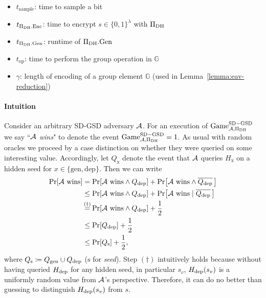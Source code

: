 \begin{theorem}
\begin{itemize}
		\item $t_{\mathrm{sample}}$: time to sample a bit
		\item $t_{\Pi_{\mathrm{DH}}.\mathrm{Enc}}$: time to encrypt $s \in \{0, 1\}^\lambda$ with $\Pi_{\mathrm{DH}}$
		\item $t_{\Pi_{\mathrm{DH}}.\mathrm{Gen}}$: runtime of $\Pi_{\mathrm{DH}}.\mathrm{Gen}$
		\item $t_{\mathrm{op}}$: time to perform the group operation in $\mathbb{G}$
		\item $\gamma$: length of encoding of a group element $\mathbb{G}$ (used in Lemma~\ref{lemma:eav-reduction})
	\end{itemize}
\end{theorem}

\paragraph{Intuition}
Consider an arbitrary SD-GSD adversary $\mathcal{A}$. For an execution of $\mathrm{Game}_{\mathcal{A}, \Pi_{\mathrm{DH}}}^{\mathrm{SD-GSD}}$ we say ``\emph{$\mathcal{A}$ wins}" to denote the event $\mathrm{Game}_{\mathcal{A}, \Pi_{\mathrm{DH}}}^{\mathrm{SD-GSD}} = 1$.
As usual with random oracles we proceed by a case distinction on whether they were queried on some interesting value. Accordingly, let $Q_{\mathrm{x}}$ denote the event that $\mathcal{A}$ queries $H_{\mathrm{x}}$ on a hidden seed for $x \in \{\mathrm{gen}, \mathrm{dep}\}$. Then we can write
\begin{align} \label{eq:theorem-sd-gsd-security-win-cases}
	\begin{split}
		\pr{\wins} & = \pr{\wins \land \qdep} + \pr{\wins \land \overline{\qdep} \,} \\
		& \le \pr{\wins \land \qdep} + \pr{\wins \mid \overline{\qdep} \,} \\
		& \stackrel{\mathclap{(\dagger)}}{=}  \pr{\wins \land \qdep} + \frac{1}{2}         \\
		& \le \pr{\qdep} + \frac{1}{2} \\
		& \le \pr{\qs} + \frac{1}{2},
	\end{split}
\end{align}
where $Q_\mathrm{s} \coloneqq Q_\mathrm{gen} \cup Q_\mathrm{dep}$ ($\mathrm{s}$ for \emph{seed}). Step $(\dagger)$ intuitively holds because without having queried $H_\mathrm{dep}$ for any hidden seed, in particular $s_v$, $H_\mathrm{dep}(s_v)$ is a uniformly random value from $\mathcal{A}$'s perspective. Therefore, it can do no better than guessing to distinguish $H_\mathrm{dep}(s_v)$ from $s$.


